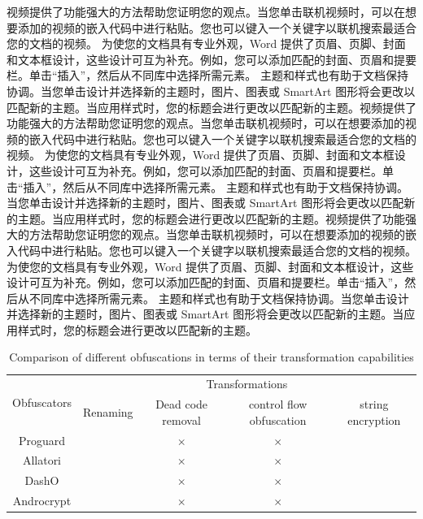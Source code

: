视频提供了功能强大的方法帮助您证明您的观点。当您单击联机视频时，可以在想要添加的视频的嵌入代码中进行粘贴。您也可以键入一个关键字以联机搜索最适合您的文档的视频。
为使您的文档具有专业外观，Word 提供了页眉、页脚、封面和文本框设计，这些设计可互为补充。例如，您可以添加匹配的封面、页眉和提要栏。单击“插入”，然后从不同库中选择所需元素。
主题和样式也有助于文档保持协调。当您单击设计并选择新的主题时，图片、图表或 SmartArt 图形将会更改以匹配新的主题。当应用样式时，您的标题会进行更改以匹配新的主题。视频提供了功能强大的方法帮助您证明您的观点。当您单击联机视频时，可以在想要添加的视频的嵌入代码中进行粘贴。您也可以键入一个关键字以联机搜索最适合您的文档的视频。
为使您的文档具有专业外观，Word 提供了页眉、页脚、封面和文本框设计，这些设计可互为补充。例如，您可以添加匹配的封面、页眉和提要栏。单击“插入”，然后从不同库中选择所需元素。
主题和样式也有助于文档保持协调。当您单击设计并选择新的主题时，图片、图表或 SmartArt 图形将会更改以匹配新的主题。当应用样式时，您的标题会进行更改以匹配新的主题。视频提供了功能强大的方法帮助您证明您的观点。当您单击联机视频时，可以在想要添加的视频的嵌入代码中进行粘贴。您也可以键入一个关键字以联机搜索最适合您的文档的视频。
为使您的文档具有专业外观，Word 提供了页眉、页脚、封面和文本框设计，这些设计可互为补充。例如，您可以添加匹配的封面、页眉和提要栏。单击“插入”，然后从不同库中选择所需元素。
主题和样式也有助于文档保持协调。当您单击设计并选择新的主题时，图片、图表或 SmartArt 图形将会更改以匹配新的主题。当应用样式时，您的标题会进行更改以匹配新的主题。

\begin{table}
	\centering
	\caption{Comparison of different obfuscations in terms of their transformation capabilities}
	\begin{tabular}{ccccc} %
		\toprule
		\multirow{2}{*}{Obfuscators} & \multicolumn{4}{c}{Transformations}   \\
		\cline{2-5}  %
		&    Renaming & Dead code removal & control flow obfuscation & string encryption \\
		\midrule
		Proguard &  \checkmark & $\times$  & $\times$ & \checkmark   \\
		Allatori & \checkmark & $\times$  & $\times$ & \checkmark \\
		DashO & \checkmark & $\times$  & $\times$ & \checkmark \\
		Androcrypt & \checkmark & $\times$  & $\times$ & \checkmark  \\
		\bottomrule
	\end{tabular}
	\label{tbl:table1}
\end{table}

